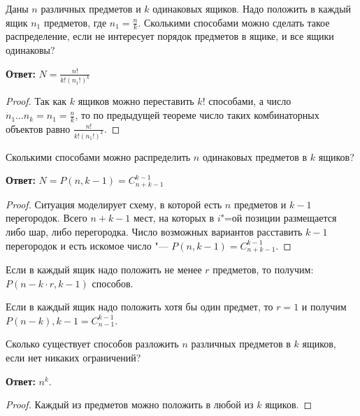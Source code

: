 \begin{theorem}[О разложении $\displaystyle n_1 = \frac{n}{k}$ предметов в $k$ ящиков]
    Даны $n$ различных предметов и $k$ одинаковых ящиков. Надо положить в каждый
ящик $n_1$ предметов, где $\displaystyle n_1 = \frac{n}{k}$. 
Сколькими способами можно сделать такое распределение,
если не интересует порядок предметов в ящике, и все ящики одинаковы? 

\textbf{Ответ:} $\displaystyle N = \frac{n!}{k!(n_1!)^k}$

\begin{proof}
    Так как $k$ ящиков можно переставить $k!$ способами, а число $\displaystyle n_1 \dots n_k = n_1 = \frac{n}{k}$, то
    по предыдущей теореме число таких комбинаторных объектов равно $\displaystyle \frac{n!}{k!(n_1!)^k}$.
\end{proof}

\end{theorem}

\begin{theorem}
    Сколькими способами можно распределить $n$ одинаковых предметов в $k$ ящиков?

    \textbf{Ответ:} $N = P(n, k - 1) = C_{n + k - 1}^{k - 1}$

    \begin{proof}
        Ситуация моделирует схему, в которой есть $n$ предметов и $k - 1$ перегородок.
        Всего $n + k - 1$ мест, на которых в $i$"=ой позиции размещается либо шар, либо
        перегородка. Число возможных вариантов расставить $k - 1$ перегородок и есть
        искомое число "--- $P(n, k - 1) = C_{n + k - 1}^{k - 1}$.
    \end{proof}
\end{theorem}

\begin{corollary}
    Если в каждый ящик надо положить не менее $r$ предметов, то получим: $P(n - k \cdot r, k - 1)$ способов. 
\end{corollary}

\begin{corollary}
    Если в каждый ящик надо положить хотя бы один предмет, то $r = 1$ и получим
    $P(n - k), k - 1 = C_{n - 1}^{k - 1}$.
\end{corollary}

\begin{theorem}
    Сколько существует способов разложить $n$ различных предметов в $k$ ящиков, если
нет никаких ограничений? 

    \textbf{Ответ:} $n^k$.

    \begin{proof}
        Каждый из предметов можно положить в любой из $k$ ящиков. 
    \end{proof}
\end{theorem}

